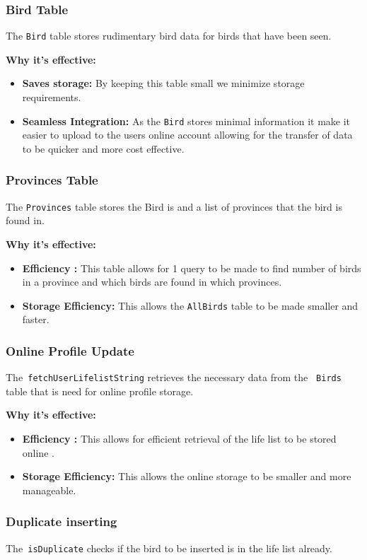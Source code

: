 \documentclass{article}
\begin{document}
\subsubsection{Bird Table }
The \texttt{Bird} table stores rudimentary bird data for birds that have been seen.

\textbf{Why it's effective:}
\begin{itemize}
    \item \textbf{Saves storage:} By keeping this table small we minimize storage requirements.
    \item \textbf{Seamless Integration:} As the \texttt{Bird} stores minimal information it make it easier to upload to the users online account allowing for the transfer of data to be quicker and more cost effective.
\end{itemize}

\subsubsection{Provinces Table }
The \texttt{Provinces} table stores the Bird is and a list of provinces that the bird is found in.

\textbf{Why it's effective:}
\begin{itemize}
    \item \textbf{Efficiency :} This table allows for 1 query to be made to find number of birds in a province and which birds are found in which provinces.
    \item \textbf{Storage Efficiency:} This allows the \texttt{AllBirds} table to be made smaller and faster.
\end{itemize}

\subsubsection{Online Profile Update}
The\texttt{\ fetchUserLifelistString} retrieves the necessary data from the \texttt{\ Birds} table that is need for online profile storage.

\textbf{Why it's effective:}
\begin{itemize}
    \item \textbf{Efficiency :} This allows for efficient retrieval of the life list to be stored online .
    \item \textbf{Storage Efficiency:} This allows the online storage to be smaller and more manageable.
\end{itemize}

\subsubsection{Duplicate inserting}
The\texttt{\ isDuplicate} checks if the bird to be inserted is in the life list already.
\end{document}
